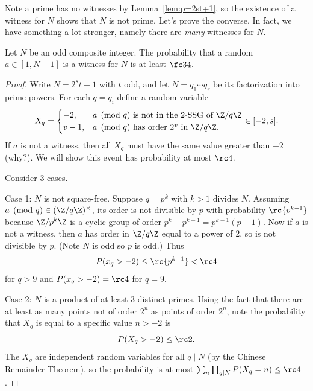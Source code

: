 Note a prime has no witnesses by Lemma~\ref{lem:p=2st+1}, so the existence of a witness for $N$ shows that $N$ is not prime. Let's prove the converse. In fact, we have something a lot stronger, namely there are {\it many} witnesses for $N$.
\begin{thm}
Let $N$ be an odd composite integer. The probability that a random $a\in [1,N-1]$ is a witness for $N$ is at least $\fc 34$.
\end{thm}
\begin{proof}
Write $N=2^st+1$ with $t$ odd, and let $N=q_1\cdots q_r$ be its factorization into prime powers. For each $q=q_i$ define a random variable
\[
X_q=\begin{cases}
-2,&a\pmod q \text{ is not in the 2-SSG of }\Z/q\Z\\
v-1,&a\pmod q \text{ has order $2^v$ in }\Z/q\Z.
\end{cases}\in [-2,s].
\]
If $a$ is not a witness, then all $X_q$ must have the same value greater than $-2$ (why?).
We will show this event has probability at most $\rc 4$.

Consider 3 cases. 

Case 1: $N$ is not square-free. Suppose $q=p^k$ with $k>1$ divides $N$. Assuming $a\pmod q\in (\Z/q\Z)^{\times}$, its order is not divisible by $p$ with probability $\rc{p^{k-1}}$ because $\Z/p^k\Z$ is a cyclic group of order $p^k-p^{k-1}=p^{k-1}(p-1)$. Now if $a$ is not a witness, then $a$ has order in $\Z/q\Z$ equal to a power of 2, so is not divisible by $p$. (Note $N$ is odd so $p$ is odd.) Thus
\[
P(x_q>-2)\le \rc{p^{k-1}}<\rc 4
\]
for $q>9$ and $P(x_q>-2)=\rc 4$ for $q=9$. %

Case 2: $N$ is a product of at least 3 distinct primes. Using the fact that there are at least as many points not of order $2^n$ as points of order $2^n$, note the probability that $X_q$ is equal to a specific value $n>-2$ is
\[
P(X_q>-2)\le \rc2.
\]
The $X_q$ are independent random variables for all $q\mid N$ (by the Chinese Remainder Theorem), so the probability is at most $\sum_{n} \prod_{q\mid N}P(X_q=n)\le \rc 4$. %


\end{proof}
